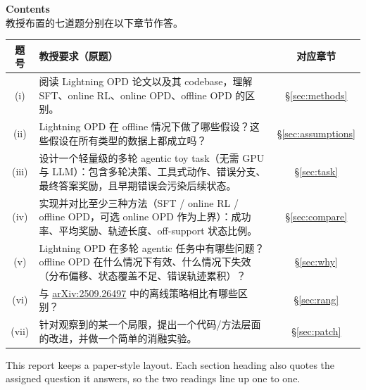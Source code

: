 \documentclass[11pt]{article}
\begin{document}
\hrulefill

\newpage
\thispagestyle{empty}
\begin{center}
{\Large\textbf{Contents}}\\[0.3em]
{\small 教授布置的七道题分别在以下章节作答。}
\end{center}
\vspace{1.5em}

\begin{center}
\renewcommand{\arraystretch}{1.6}
\begin{tabular}{c p{10.5cm} c}
\toprule
\textbf{题号} & \textbf{教授要求（原题）} & \textbf{对应章节} \\
\midrule
(i)   & 阅读 Lightning OPD 论文以及其 codebase，理解 SFT、online RL、online OPD、offline OPD 的区别。 & \S\ref{sec:methods} \\
(ii)  & Lightning OPD 在 offline 情况下做了哪些假设？这些假设在所有类型的数据上都成立吗？ & \S\ref{sec:assumptions} \\
(iii) & 设计一个轻量级的多轮 agentic toy task（无需 GPU 与 LLM）：包含多轮决策、工具式动作、错误分支、最终答案奖励，且早期错误会污染后续状态。 & \S\ref{sec:task} \\
(iv)  & 实现并对比至少三种方法（SFT / online RL / offline OPD，可选 online OPD 作为上界）：成功率、平均奖励、轨迹长度、off-support 状态比例。 & \S\ref{sec:compare} \\
(v)   & Lightning OPD 在多轮 agentic 任务中有哪些问题？offline OPD 在什么情况下有效、什么情况下失效（分布偏移、状态覆盖不足、错误轨迹累积）？ & \S\ref{sec:why} \\
(vi)  & 与 \href{https://arxiv.org/pdf/2509.26497}{arXiv:2509.26497} 中的离线策略相比有哪些区别？ & \S\ref{sec:rang} \\
(vii) & 针对观察到的某一个局限，提出一个代码/方法层面的改进，并做一个简单的消融实验。 & \S\ref{sec:patch} \\
\bottomrule
\end{tabular}
\end{center}
\vspace{1.5em}

\begin{center}
\small This report keeps a paper-style layout. Each section heading also quotes the
assigned question it answers, so the two readings line up one to one.
\end{center}

\newpage

\end{document}
